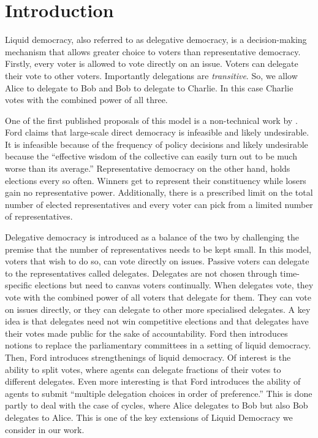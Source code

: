 \documentclass[11pt,a4paper, titlepage]{article}
\theoremstyle{definition}
\begin{document}
\newpage

\tableofcontents

\newpage

\section{Introduction}

Liquid democracy, also referred to as delegative democracy, is a decision-making mechanism that allows greater choice to voters than representative democracy.
Firstly, every voter is allowed to vote directly on an issue. 
Voters can delegate their vote to other voters.
Importantly delegations are \emph{transitive}. 
So, we allow Alice to delegate to Bob and Bob to delegate to Charlie. In this case Charlie votes with the combined power of all three.

One of the first published proposals of this model is a non-technical work by \cite{ford2002delegative}. 
Ford claims that large-scale direct democracy is infeasible and likely undesirable.
It is infeasible because of the frequency of policy decisions and likely undesirable because the ``effective wisdom of the collective can easily turn out to be much worse than its average.''
Representative democracy on the other hand, holds elections every so often. Winners get to represent their constituency while losers gain no representative power.
Additionally, there is a prescribed limit on the total number of elected representatives and every voter can pick from a limited number of representatives.

Delegative democracy is introduced as a balance of the two by challenging the premise that the number of representatives needs to be kept small.
In this model, voters that wish to do so, can vote directly on issues.
Passive voters can delegate to the representatives called delegates.
Delegates are not chosen through time-specific elections but need to canvas voters continually.
When delegates vote, they vote with the combined power of all voters that delegate for them.
They can vote on issues directly, or they can delegate to other more specialised delegates.
A key idea is that delegates need not win competitive elections and that delegates have their votes made public for the sake of accountability. 
Ford then introduces notions to replace the parliamentary committees in a setting of liquid democracy.
Then, Ford introduces strengthenings of liquid democracy.
Of interest is the ability to split votes, where agents can delegate fractions of their votes to different delegates. 
Even more interesting is that Ford introduces the ability of agents to submit ``multiple delegation choices in order of preference.'' This is done partly to deal with the case of cycles, where Alice delegates to Bob but also Bob delegates to Alice.
This is one of the key extensions of Liquid Democracy we consider in our work.
\end{document}
